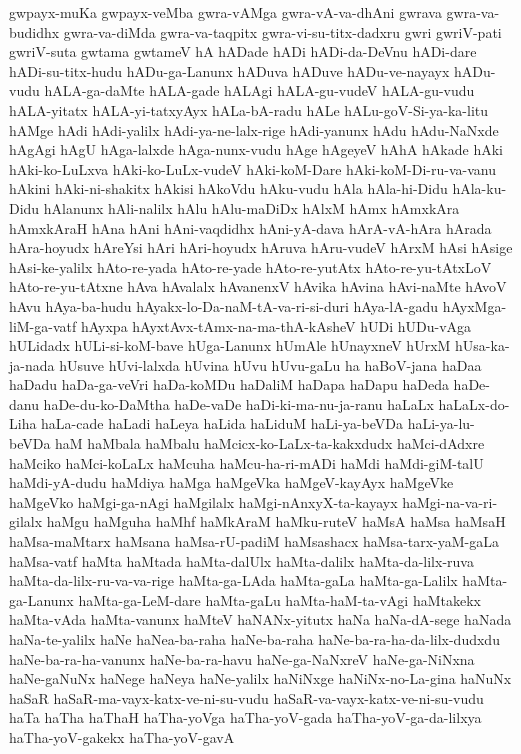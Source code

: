 {gwpayx-muKa
gwpayx-veMba
gwra-vAMga
gwra-vA-va-dhAni
gwrava
gwra-va-budidhx
gwra-va-diMda
gwra-va-taqpitx
gwra-vi-su-titx-dadxru
gwri
gwriV-pati
gwriV-suta
gwtama
gwtameV
hA
hADade
hADi
hADi-da-DeVnu
hADi-dare
hADi-su-titx-hudu
hADu-ga-Lanunx
hADuva
hADuve
hADu-ve-nayayx
hADu-vudu
hALA-ga-daMte
hALA-gade
hALAgi
hALA-gu-vudeV
hALA-gu-vudu
hALA-yitatx
hALA-yi-tatxyAyx
hALa-bA-radu
hALe
hALu-goV-Si-ya-ka-litu
hAMge
hAdi
hAdi-yalilx
hAdi-ya-ne-lalx-rige
hAdi-yanunx
hAdu
hAdu-NaNxde
hAgAgi
hAgU
hAga-lalxde
hAga-nunx-vudu
hAge
hAgeyeV
hAhA
hAkade
hAki
hAki-ko-LuLxva
hAki-ko-LuLx-vudeV
hAki-koM-Dare
hAki-koM-Di-ru-va-vanu
hAkini
hAki-ni-shakitx
hAkisi
hAkoVdu
hAku-vudu
hAla
hAla-hi-Didu
hAla-ku-Didu
hAlanunx
hAli-nalilx
hAlu
hAlu-maDiDx
hAlxM
hAmx
hAmxkAra
hAmxkAraH
hAna
hAni
hAni-vaqdidhx
hAni-yA-dava
hArA-vA-hAra
hArada
hAra-hoyudx
hAreYsi
hAri
hAri-hoyudx
hAruva
hAru-vudeV
hArxM
hAsi
hAsige
hAsi-ke-yalilx
hAto-re-yada
hAto-re-yade
hAto-re-yutAtx
hAto-re-yu-tAtxLoV
hAto-re-yu-tAtxne
hAva
hAvalalx
hAvanenxV
hAvika
hAvina
hAvi-naMte
hAvoV
hAvu
hAya-ba-hudu
hAyakx-lo-Da-naM-tA-va-ri-si-duri
hAya-lA-gadu
hAyxMga-liM-ga-vatf
hAyxpa
hAyxtAvx-tAmx-na-ma-thA-kAsheV
hUDi
hUDu-vAga
hULidadx
hULi-si-koM-bave
hUga-Lanunx
hUmAle
hUnayxneV
hUrxM
hUsa-ka-ja-nada
hUsuve
hUvi-lalxda
hUvina
hUvu
hUvu-gaLu
ha
haBoV-jana
haDaa
haDadu
haDa-ga-veVri
haDa-koMDu
haDaliM
haDapa
haDapu
haDeda
haDe-danu
haDe-du-ko-DaMtha
haDe-vaDe
haDi-ki-ma-nu-ja-ranu
haLaLx
haLaLx-do-Liha
haLa-cade
haLadi
haLeya
haLida
haLiduM
haLi-ya-beVDa
haLi-ya-lu-beVDa
haM
haMbala
haMbalu
haMcicx-ko-LaLx-ta-kakxdudx
haMci-dAdxre
haMciko
haMci-koLaLx
haMcuha
haMcu-ha-ri-mADi
haMdi
haMdi-giM-talU
haMdi-yA-dudu
haMdiya
haMga
haMgeVka
haMgeV-kayAyx
haMgeVke
haMgeVko
haMgi-ga-nAgi
haMgilalx
haMgi-nAnxyX-ta-kayayx
haMgi-na-va-ri-gilalx
haMgu
haMguha
haMhf
haMkAraM
haMku-ruteV
haMsA
haMsa
haMsaH
haMsa-maMtarx
haMsana
haMsa-rU-padiM
haMsashacx
haMsa-tarx-yaM-gaLa
haMsa-vatf
haMta
haMtada
haMta-dalUlx
haMta-dalilx
haMta-da-lilx-ruva
haMta-da-lilx-ru-va-va-rige
haMta-ga-LAda
haMta-gaLa
haMta-ga-Lalilx
haMta-ga-Lanunx
haMta-ga-LeM-dare
haMta-gaLu
haMta-haM-ta-vAgi
haMtakekx
haMta-vAda
haMta-vanunx
haMteV
haNANx-yitutx
haNa
haNa-dA-sege
haNada
haNa-te-yalilx
haNe
haNea-ba-raha
haNe-ba-raha
haNe-ba-ra-ha-da-lilx-dudxdu
haNe-ba-ra-ha-vanunx
haNe-ba-ra-havu
haNe-ga-NaNxreV
haNe-ga-NiNxna
haNe-gaNuNx
haNege
haNeya
haNe-yalilx
haNiNxge
haNiNx-no-La-gina
haNuNx
haSaR
haSaR-ma-vayx-katx-ve-ni-su-vudu
haSaR-va-vayx-katx-ve-ni-su-vudu
haTa
haTha
haThaH
haTha-yoVga
haTha-yoV-gada
haTha-yoV-ga-da-lilxya
haTha-yoV-gakekx
haTha-yoV-gavA
}
